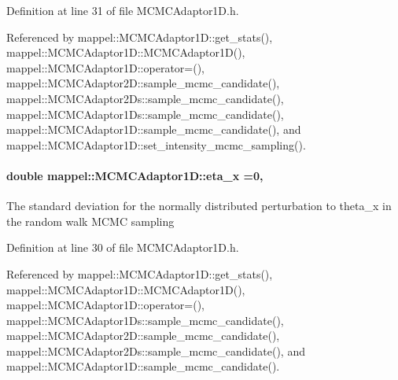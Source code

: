 Definition at line 31 of file M\+C\+M\+C\+Adaptor1\+D.\+h.



Referenced by mappel\+::\+M\+C\+M\+C\+Adaptor1\+D\+::get\+\_\+stats(), mappel\+::\+M\+C\+M\+C\+Adaptor1\+D\+::\+M\+C\+M\+C\+Adaptor1\+D(), mappel\+::\+M\+C\+M\+C\+Adaptor1\+D\+::operator=(), mappel\+::\+M\+C\+M\+C\+Adaptor2\+D\+::sample\+\_\+mcmc\+\_\+candidate(), mappel\+::\+M\+C\+M\+C\+Adaptor2\+Ds\+::sample\+\_\+mcmc\+\_\+candidate(), mappel\+::\+M\+C\+M\+C\+Adaptor1\+Ds\+::sample\+\_\+mcmc\+\_\+candidate(), mappel\+::\+M\+C\+M\+C\+Adaptor1\+D\+::sample\+\_\+mcmc\+\_\+candidate(), and mappel\+::\+M\+C\+M\+C\+Adaptor1\+D\+::set\+\_\+intensity\+\_\+mcmc\+\_\+sampling().

\paragraph[{\texorpdfstring{eta\+\_\+x}{eta_x}}]{\setlength{\rightskip}{0pt plus 5cm}double mappel\+::\+M\+C\+M\+C\+Adaptor1\+D\+::eta\+\_\+x =0\hspace{0.3cm}{\ttfamily [protected]}, {\ttfamily [inherited]}}\hypertarget{classmappel_1_1MCMCAdaptor1D_ae5787e38c9cef6168acf6fc5d3216693}{}\label{classmappel_1_1MCMCAdaptor1D_ae5787e38c9cef6168acf6fc5d3216693}
The standard deviation for the normally distributed perturbation to theta\+\_\+x in the random walk M\+C\+MC sampling 

Definition at line 30 of file M\+C\+M\+C\+Adaptor1\+D.\+h.



Referenced by mappel\+::\+M\+C\+M\+C\+Adaptor1\+D\+::get\+\_\+stats(), mappel\+::\+M\+C\+M\+C\+Adaptor1\+D\+::\+M\+C\+M\+C\+Adaptor1\+D(), mappel\+::\+M\+C\+M\+C\+Adaptor1\+D\+::operator=(), mappel\+::\+M\+C\+M\+C\+Adaptor1\+Ds\+::sample\+\_\+mcmc\+\_\+candidate(), mappel\+::\+M\+C\+M\+C\+Adaptor2\+D\+::sample\+\_\+mcmc\+\_\+candidate(), mappel\+::\+M\+C\+M\+C\+Adaptor2\+Ds\+::sample\+\_\+mcmc\+\_\+candidate(), and mappel\+::\+M\+C\+M\+C\+Adaptor1\+D\+::sample\+\_\+mcmc\+\_\+candidate().


